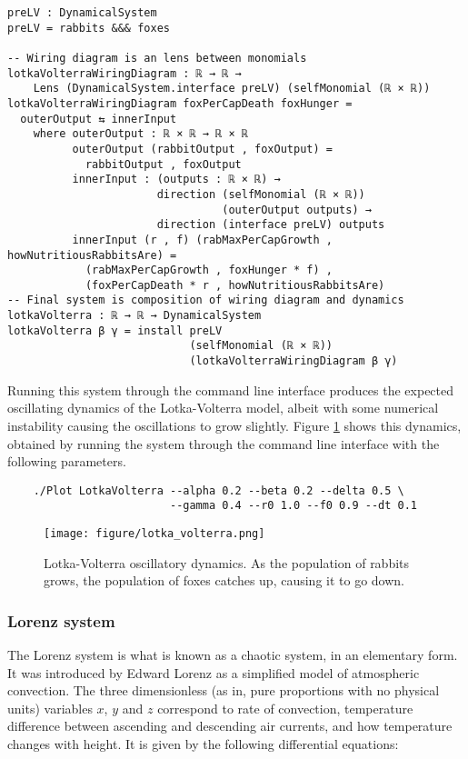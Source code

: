 \begin{verbatim}
preLV : DynamicalSystem
preLV = rabbits &&& foxes

-- Wiring diagram is an lens between monomials
lotkaVolterraWiringDiagram : ℝ → ℝ → 
    Lens (DynamicalSystem.interface preLV) (selfMonomial (ℝ × ℝ))
lotkaVolterraWiringDiagram foxPerCapDeath foxHunger = 
  outerOutput ⇆ innerInput
    where outerOutput : ℝ × ℝ → ℝ × ℝ
          outerOutput (rabbitOutput , foxOutput) = 
            rabbitOutput , foxOutput
          innerInput : (outputs : ℝ × ℝ) → 
                       direction (selfMonomial (ℝ × ℝ)) 
                                 (outerOutput outputs) →
                       direction (interface preLV) outputs
          innerInput (r , f) (rabMaxPerCapGrowth , howNutritiousRabbitsAre) = 
            (rabMaxPerCapGrowth , foxHunger * f) , 
            (foxPerCapDeath * r , howNutritiousRabbitsAre)
-- Final system is composition of wiring diagram and dynamics
lotkaVolterra : ℝ → ℝ → DynamicalSystem
lotkaVolterra β γ = install preLV 
                            (selfMonomial (ℝ × ℝ))
                            (lotkaVolterraWiringDiagram β γ)
\end{verbatim}

Running this system through the command line interface produces the expected oscillating dynamics of the Lotka-Volterra model, albeit with some numerical instability causing the oscillations to grow slightly. Figure \ref{fig:lvfig} shows this dynamics, obtained by running the system through the command line interface with the following parameters.

\begin{verbatim}
    ./Plot LotkaVolterra --alpha 0.2 --beta 0.2 --delta 0.5 \
                         --gamma 0.4 --r0 1.0 --f0 0.9 --dt 0.1
    \end{verbatim}

\begin{figure}[H]
    \centering
    \texttt{[image: figure/lotka\_volterra.png]}
    \caption{Lotka-Volterra oscillatory dynamics. As the population of rabbits grows, the population of foxes catches up, causing it to go down.}
    \label{fig:lvfig}
\end{figure}


\subsubsection{Lorenz system}
The Lorenz system \cite{lorenz1963} is what is known as a chaotic system, in an elementary form. It was introduced by Edward Lorenz as a simplified model of atmospheric convection. The three dimensionless (as in, pure proportions with no physical units) variables $x$, $y$ and $z$ correspond to rate of convection, temperature difference between ascending and descending air currents, and how temperature changes with height. It is given by the following differential equations:

